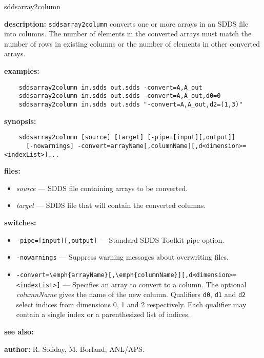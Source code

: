 \begin{sddsprog}{sddsarray2column}
  \item \textbf{description:} \verb|sddsarray2column| converts one or more arrays in an SDDS file into columns. The number of elements in the converted arrays must match the number of rows in existing columns or the number of elements in other converted arrays.
  \item \textbf{examples:}
    \begin{verbatim}
    sddsarray2column in.sdds out.sdds -convert=A,A_out
    sddsarray2column in.sdds out.sdds -convert=A,A_out,d0=0
    sddsarray2column in.sdds out.sdds "-convert=A,A_out,d2=(1,3)"
    \end{verbatim}
  \item \textbf{synopsis:}
    \begin{verbatim}
    sddsarray2column [source] [target] [-pipe=[input][,output]]
      [-nowarnings] -convert=arrayName[,columnName][,d<dimension>=<indexList>]...
    \end{verbatim}
  \item \textbf{files:}
    \begin{itemize}
      \item {\em source} --- SDDS file containing arrays to be converted.
      \item {\em target} --- SDDS file that will contain the converted columns.
    \end{itemize}
  \item \textbf{switches:}
    \begin{itemize}
      \item \verb|-pipe=[input][,output]| --- Standard SDDS Toolkit pipe option.
      \item \verb|-nowarnings| --- Suppress warning messages about overwriting files.
      \item \verb|-convert=\emph{arrayName}[,\emph{columnName}][,d<dimension>=<indexList>]| --- Specifies an array to convert to a column. The optional \emph{columnName} gives the name of the new column. Qualifiers \verb|d0|, \verb|d1| and \verb|d2| select indices from dimensions 0, 1 and 2 respectively. Each qualifier may contain a single index or a parenthesized list of indices.
    \end{itemize}
  \item \textbf{see also:} 
  \item \textbf{author:} R. Soliday, M. Borland, ANL/APS.
\end{sddsprog}

